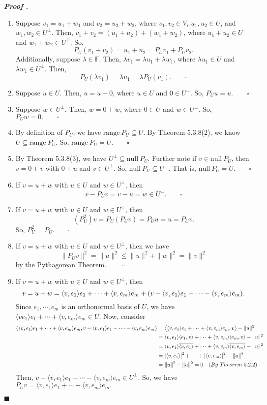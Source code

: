 \documentclass[11pt, letterpaper]{article}
\newcounter{nprf}[subsection]
\newenvironment*{prf}{\par\indent\textbf{\textit{Proof \stepcounter{nprf}\thenprf.}}}{\hfill$\blacksquare$\par}
\def\F{\mathbb{F}}
\def\pqde{\qquad\square}
\def\Null{\mathrm{null\ }}
\def\range{\mathrm{range\ }}
\begin{document}
\begin{prf}
	\begin{enumerate}
		\item Suppose $v_1=u_1+w_1$ and $v_2=u_2+w_2$, where $v_1,v_2\in V$, $u_1,u_2\in U$, and $w_1,w_2\in U^\perp$. Then, $v_1+v_2=(u_1+u_2)+(w_1+w_2)$, where $u_1+u_2\in U$ and $w_1+w_2\in U^\perp$. So, \[P_U(v_1+v_2)=u_1+u_2=P_Uv_1+P_Uv_2.\] Additionally, suppose $\lambda\in\F$. Then, $\lambda v_1=\lambda u_1+\lambda w_1$, where $\lambda u_1\in U$ and $\lambda w_1\in U^\perp$. Then, \[P_U(\lambda v_1)=\lambda u_1=\lambda P_U(v_1).\pqde\]
		\item Suppose $u\in U$. Then, $u=u+0$, where $u\in U$ and $0\in U^\perp$. So, $P_Uu=u.\pqde$
		\item Suppose $w\in U^\perp$. Then, $w=0+w$, where $0\in U$ and $w\in U^\perp$. So, $P_Uw=0.\pqde$
		\item By definition of $P_U$, we have $\range P_U\subseteq U$. By Theorem 5.3.8(2), we know $U\subseteq\range P_U$. So, $\range P_U=U.\pqde$
		\item By Theorem 5.3.8(3), we have $U^\perp\subseteq\Null P_U$. Further note if $v\in\Null P_U$, then $v=0+v$ with $0+u$ and $v\in U^\perp$. So, $\Null P_U\subseteq U^\perp$. That is, $\Null P_U=U.\pqde$
		\item If $v=u+w$ with $u\in U$ and $w\in U^\perp$, then \[v-P_Uv=v-u=w\in U^\perp.\pqde\]
		\item If $v=u+w$ with $u\in U$ and $w\in U^\perp$, then \[(P_U^2)v=P_U(P_Uv)=P_Uu=u=P_Uv.\] So, $P_U^2=P_U.\pqde$
		\item If $v=u+w$ with $u\in U$ and $w\in U^\perp$, then we have \[\|P_Uv\|^2=\|u\|^2\leq\|u\|^2+\|w\|^2=\|v\|^2\] by the Pythagorean Theorem. $\pqde$
		\item If $v=u+w$ with $u\in U$ and $w\in U^\perp$, then \[v=u+w=\langle v,e_1\rangle e_1+\cdots+\langle v,e_m\rangle e_m+\qty(v-\langle v,e_1\rangle e_1-\dots-\langle v,e_m\rangle e_m).\] Since $e_1,\cdots,e_m$ is an orthonormal basis of $U$, we have $\langle ve_1\rangle e_1+\cdots+\langle v,e_m\rangle e_m\in U$. Now, consider \[\begin{aligned}\big\langle\langle v,e_1\rangle e_1+\cdots+\langle v,e_m\rangle e_m,v-\langle v,e_1\rangle e_1-\cdots-\langle v,e_m\rangle e_m\big\rangle&=\big\langle\langle v,e_1\rangle e_1+\cdots+\langle v,e_m\rangle e_m,v\big\rangle-\|u\|^2\\&=\langle v,e_1\rangle\langle e_1,v\rangle+\cdots+\langle v,e_m\rangle\langle e_m,v\rangle-\|u\|^2\\&=\langle v,e_1\rangle\overline{\langle v,e_1\rangle}+\cdots+\langle v,e_m\rangle\overline{\langle v,e_m\rangle}-\|u\|^2\\&=\qty|\langle v,e_1\rangle|^2+\cdots+\qty|\langle v,e_m\rangle|^2-\|u\|^2\\&=\|u\|^2-\|u\|^2=0\quad (By\ Theorem\ 5.2.2)\end{aligned}\] Then, $v-\langle v,e_1\rangle e_1-\cdots-\langle v,e_m\rangle e_m\in U^\perp$. So, we have $P_Uv=\langle v,e_1\rangle e_1+\cdots+\langle v,e_m\rangle e_m.$
	\end{enumerate}	
\end{prf}
\end{document}

